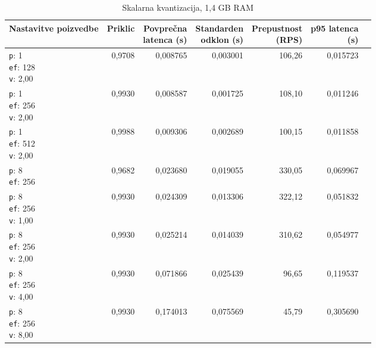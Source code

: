 \begin{table}[htbp]
  \centering
\small
  \caption{Skalarna kvantizacija, 1,4 GB RAM}
  \label{tab:single-2cpu-1.4ram:sq:qdrant-dipl-baseline-tenant-subgraph-sq-ext-m16-ef-128-random-768-100-tenants-extended-upload-2026-08-18-21-57-01.json}
  \begin{tabularx}{\textwidth}{Xrrrrrr}
    \toprule
    Nastavitve poizvedbe & Priklic & \makecell{Povprečna\\latenca (s)} & \makecell{Standarden\\odklon (s)} & \makecell{Prepustnost\\(RPS)} & \makecell{p95 latenca\\(s)}  \\
    \midrule
    \makecell{\texttt{p}: 1\\\texttt{ef}: 128\\\texttt{v}: 2,00} & 0,9708 & 0,008765 & 0,003001 & 106,26 & 0,015723 \\
    \makecell{\texttt{p}: 1\\\texttt{ef}: 256\\\texttt{v}: 2,00} & 0,9930 & 0,008587 & 0,001725 & 108,10 & 0,011246 \\
    \makecell{\texttt{p}: 1\\\texttt{ef}: 512\\\texttt{v}: 2,00} & 0,9988 & 0,009306 & 0,002689 & 100,15 & 0,011858 \\
    \makecell{\texttt{p}: 8\\\texttt{ef}: 256} & 0,9682 & 0,023680 & 0,019055 & 330,05 & 0,069967 \\
    \makecell{\texttt{p}: 8\\\texttt{ef}: 256\\\texttt{v}: 1,00} & 0,9930 & 0,024309 & 0,013306 & 322,12 & 0,051832 \\
    \makecell{\texttt{p}: 8\\\texttt{ef}: 256\\\texttt{v}: 2,00} & 0,9930 & 0,025214 & 0,014039 & 310,62 & 0,054977 \\
    \makecell{\texttt{p}: 8\\\texttt{ef}: 256\\\texttt{v}: 4,00} & 0,9930 & 0,071866 & 0,025439 & 96,65 & 0,119537 \\
    \makecell{\texttt{p}: 8\\\texttt{ef}: 256\\\texttt{v}: 8,00} & 0,9930 & 0,174013 & 0,075569 & 45,79 & 0,305690 \\

\end{tabularx}
\end{table}
